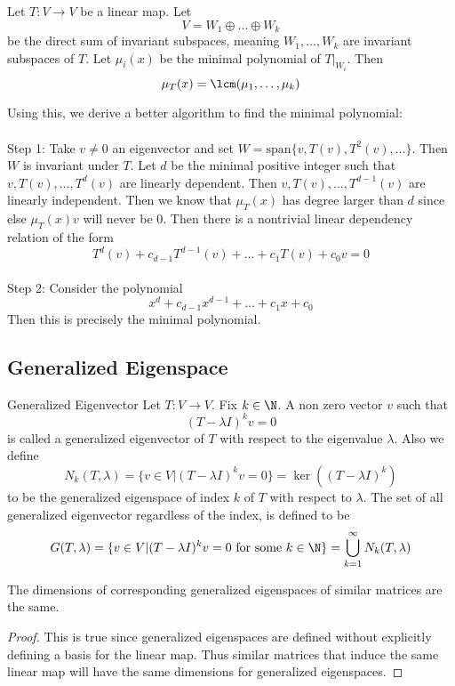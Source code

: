 \begin{lmm}{}{} Let $T:V\to V$ be a linear map. Let $$V=W_1\oplus\dots\oplus W_k$$ be the direct sum of invariant subspaces, meaning $W_1,\dots,W_k$ are invariant subspaces of $T$. Let $\mu_i(x)$ be the minimal polynomial of $T|_{W_i}$. Then $$\mu_T(x)=\lcm(\mu_1,\dots,\mu_k)$$
\end{lmm}

Using this, we derive a better algorithm to find the minimal polynomial: \\~\\
Step 1: Take $v\neq 0$ an eigenvector and set $W=\text{span}\{v,T(v),T^2(v),\dots\}$. Then $W$ is invariant under $T$. Let $d$ be the minimal positive integer such that $v,T(v),\dots,T^d(v)$ are linearly dependent. Then $v,T(v),\dots,T^{d-1}(v)$ are linearly independent. Then we know that $\mu_T(x)$ has degree larger than $d$ since else $\mu_T(x)v$ will never be $0$. Then there is a nontrivial linear dependency relation of the form $$T^d(v)+c_{d-1}T^{d-1}(v)+\dots+c_1T(v)+c_0v=0$$\\
Step 2: Consider the polynomial $$x^d+c_{d-1}x^{d-1}+\dots+c_1x+c_0$$ Then this is precisely the minimal polynomial. 

\subsection{Generalized Eigenspace}
\begin{defn}{Generalized Eigenvector}{} Let $T:V\to V$. Fix $k\in\N$. A non zero vector $v$ such that $$(T-\lambda I)^kv=0$$ is called a generalized eigenvector of $T$ with respect to the eigenvalue $\lambda$. Also we define $$N_k(T,\lambda)=\{v\in V|(T-\lambda I)^kv=0\}=\ker((T-\lambda I)^k)$$ to be the generalized eigenspace of index $k$ of $T$ with respect to $\lambda$. The set of all generalized eigenvector regardless of the index, is defined to be $$G(T,\lambda)=\{v\in V|(T-\lambda I)^kv=0\text{ for some }k\in\N\}=\bigcup_{k=1}^\infty N_k(T,\lambda)$$
\end{defn}

\begin{prp}{}{} The dimensions of corresponding generalized eigenspaces of similar matrices are the same. \tcbline
\begin{proof}
This is true since generalized eigenspaces are defined without explicitly defining a basis for the linear map. Thus similar matrices that induce the same linear map will have the same dimensions for generalized eigenspaces. 
\end{proof}
\end{prp}

